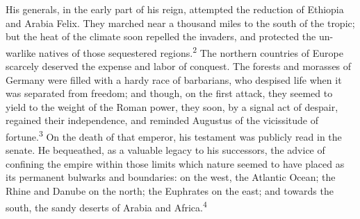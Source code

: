 
His generals, in the early part of his reign, attempted the
reduction of Ethiopia and Arabia Felix. They marched near a
thousand miles to the south of the tropic; but the heat of the
climate soon repelled the invaders, and protected the un-warlike
natives of those sequestered regions.\textsuperscript{2} The northern countries
of Europe scarcely deserved the expense and labor of conquest.
The forests and morasses of Germany were filled with a hardy race
of barbarians, who despised life when it was separated from
freedom; and though, on the first attack, they seemed to yield to
the weight of the Roman power, they soon, by a signal act of
despair, regained their independence, and reminded Augustus of
the vicissitude of fortune.\textsuperscript{3} On the death of that emperor, his
testament was publicly read in the senate. He bequeathed, as a
valuable legacy to his successors, the advice of confining the
empire within those limits which nature seemed to have placed as
its permanent bulwarks and boundaries: on the west, the Atlantic
Ocean; the Rhine and Danube on the north; the Euphrates on the
east; and towards the south, the sandy deserts of Arabia and
Africa.\textsuperscript{4}


